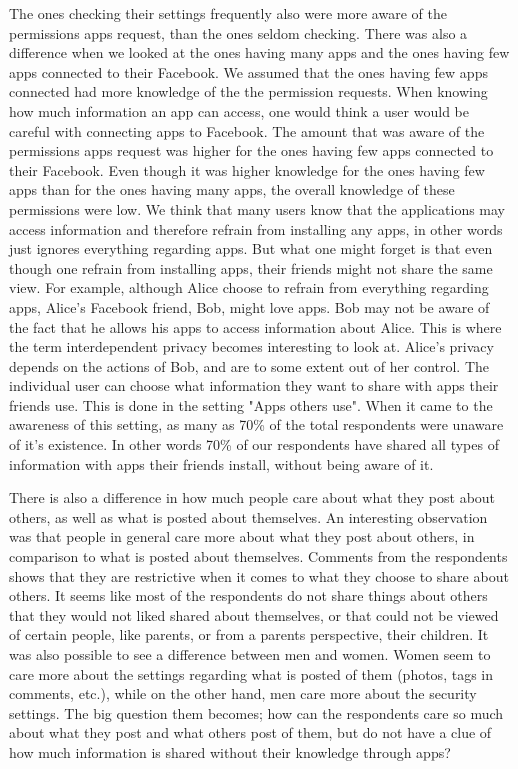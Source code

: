 The ones checking their settings frequently also were more aware of the permissions apps request, than the ones seldom checking. There was also a difference when we looked at the ones having many apps and the ones having few apps connected to their Facebook. We assumed that the ones having few apps connected had more knowledge of the the permission requests. When knowing how much information an app can access, one would think a user would be careful with connecting apps to Facebook. The amount that was aware of the permissions apps request was higher for the ones having few apps connected to their Facebook. Even though it was higher knowledge for the ones having few apps than for the ones having many apps, the overall knowledge of these permissions were low. We think that many users know that the applications may access information and therefore refrain from installing any apps, in other words just ignores everything regarding apps. But what one might forget is that even though one refrain from installing apps, their friends might not share the same view. For example, although Alice choose to refrain from everything regarding apps, Alice's Facebook friend, Bob, might love apps. Bob may not be aware of the fact that he allows his apps to access information about Alice. This is where the term interdependent privacy becomes interesting to look at. Alice's privacy depends on the actions of Bob, and are to some extent out of her control. The individual user can choose what information they want to share with apps their friends use. This is done in the setting "Apps others use". When it came to the awareness of this setting, as many as 70\% of the total respondents were unaware of it's existence. In other words 70\% of our respondents have shared all types of information with apps their friends install, without being aware of it.

There is also a difference in how much people care about what they post about others, as well as what is posted about themselves. An interesting observation was that people in general care more about what they post about others, in comparison to what is posted about themselves. Comments from the respondents shows that they are restrictive when it comes to what they choose to share about others. It seems like most of the respondents do not share things about others that they would not liked shared about themselves, or that could not be viewed of certain people, like parents, or from a parents perspective, their children. It was also possible to see a difference between men and women. Women seem to care more about the settings regarding what is posted of them (photos, tags in comments, etc.), while on the other hand, men care more about the security settings. The big question them becomes; how can the respondents care so much about what they post and what others post of them, but do not have a clue of how much information is shared without their knowledge through apps? 

